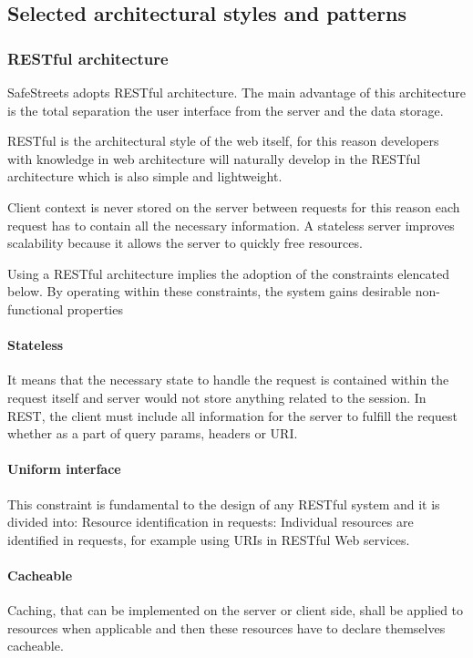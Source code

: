 \subsection{Selected architectural styles and patterns}

\subsubsection{RESTful architecture}
SafeStreets adopts RESTful architecture. The main advantage of this architecture is the total separation the user interface from the server and the data storage.

RESTful is the architectural style of the web itself, for this reason developers with knowledge in web architecture will naturally develop in the RESTful architecture which is also simple and lightweight.

Client context is never stored on the server between requests for this reason each request has to contain all the necessary information. 
A stateless server improves scalability because it allows the server to quickly free resources.

Using a RESTful architecture implies the adoption of the constraints elencated below.
By operating within these constraints, the system gains desirable non-functional properties

\paragraph{Stateless}
It means that the necessary state to handle the request is contained within the request itself and server would not store anything related to the session. In REST, the client must include all information for the server to fulfill the request whether as a part of query params, headers or URI.

\paragraph{Uniform interface}
This constraint is fundamental to the design of any RESTful system and it is divided into:
Resource identification in requests: Individual resources are identified in requests, for example using URIs in RESTful Web services. 

\paragraph{Cacheable}
Caching, that can be implemented on the server or client side, shall be applied to resources when applicable and then these resources have to declare themselves cacheable.

